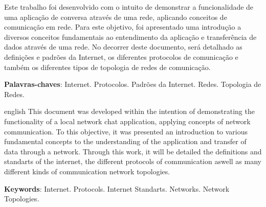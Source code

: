 
\imprimirfolhaderosto


\begin{resumo}
	\text Este trabalho foi desenvolvido com o intuito de demonstrar a funcionalidade de uma aplicação de conversa através de uma rede, aplicando conceitos de comunicação em rede. Para este objetivo, foi apresentado uma introdução a diversos conceitos fundamentais ao entendimento da aplicação e transferência de dados através de uma rede.
	\text No decorrer deste documento, será detalhado as definições e padrões da Internet, os diferentes protocolos de comunicação e também os diferentes tipos de topologia de redes de comunicação.
	\vspace{\onelineskip}

	\noindent
	\textbf{Palavras-chaves}: Internet. Protocolos. Padrões da Internet. Redes. Topologia de Redes.
\end{resumo}

\begin{resumo}[Abstract]
	\begin{otherlanguage*}{english}
		\text This document was developed within the intention of demonstrating the functionality of a local network chat application, applying concepts of network communication. To this objective, it was presented an introduction to various fundamental concepts to the understanding of the application and transfer of data through a network.
		\text Through this work, it will be detailed the definitions and standarts of the internet, the different protocols of communication aswell as many different kinds of communication network topologies.
		\vspace{\onelineskip}

		\noindent
		\textbf{Keywords}: Internet. Protocols. Internet Standarts. Networks. Network Topologies.
	\end{otherlanguage*}
\end{resumo}

